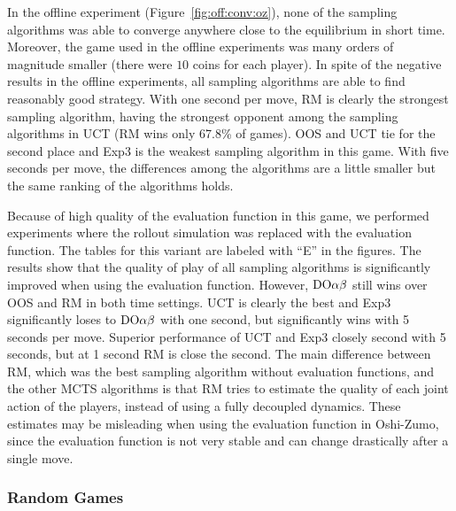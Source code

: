In the offline experiment (Figure~\ref{fig:off:conv:oz}), none of the sampling algorithms was able to converge anywhere close to the equilibrium in short time. Moreover, the game used in the offline experiments was many orders of magnitude smaller (there were $10$ coins for each player). In spite of the negative results in the offline experiments, all sampling algorithms are able to find reasonably good strategy. With one second per move, RM is clearly the strongest sampling algorithm, having the strongest opponent among the sampling algorithms in UCT (RM wins only 67.8\% of games). OOS and UCT tie for the second place and Exp3 is the weakest sampling algorithm in this game. With five seconds per move, the differences among the algorithms are a little smaller but the same ranking of the algorithms holds.

Because of high quality of the evaluation function in this game, we performed experiments where the rollout simulation was replaced with the evaluation function. 
The tables for this variant are labeled with ``E'' in the figures. 
The results show that the quality of play of all sampling algorithms is significantly improved when using the evaluation function. 
However, $\textrm{DO}\alpha\beta$ still wins over OOS and RM in both time settings.
UCT is clearly the best and Exp3 significantly loses to $\textrm{DO}\alpha\beta$ with one second, but significantly wins with 5 seconds per move.
Superior performance of UCT and Exp3 closely second with 5 seconds, but at 1 second RM is close the second. 
The main difference between RM, which was the best sampling algorithm without evaluation functions, and the other MCTS algorithms is that RM tries to estimate the quality of each joint action of the players, instead of using a fully decoupled dynamics.
These estimates may be misleading when using the evaluation function in Oshi-Zumo, since the evaluation function is not very stable and can change drastically after a single move. 


\subsubsection{Random Games}

